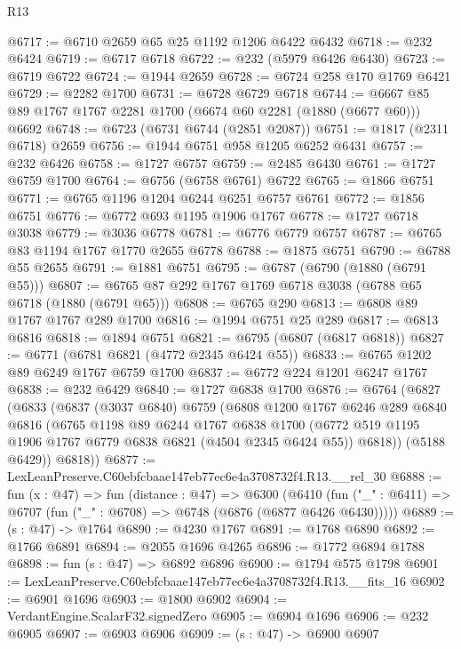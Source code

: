 \begin{lexlean}{R13}
\begin{coremodule}
@6717 := @6710 @2659 @65 @25 @1192 @1206 @6422 @6432
@6718 := @232 @6424
@6719 := @6717 @6718
@6722 := @232 (@5979 @6426 @6430)
@6723 := @6719 @6722
@6724 := @1944 @2659
@6728 := @6724 @258 @170 @1769 @6421
@6729 := @2282 @1700
@6731 := @6728 @6729 @6718
@6744 := @6667 @85 @89 @1767 @1767 @2281 @1700 (@6674 @60 @2281 (@1880 (@6677 @60))) @6692
@6748 := @6723 (@6731 @6744 (@2851 @2087))
@6751 := @1817 (@2311 @6718) @2659
@6756 := @1944 @6751 @958 @1205 @6252 @6431
@6757 := @232 @6426
@6758 := @1727 @6757
@6759 := @2485 @6430
@6761 := @1727 @6759 @1700
@6764 := @6756 (@6758 @6761) @6722
@6765 := @1866 @6751
@6771 := @6765 @1196 @1204 @6244 @6251 @6757 @6761
@6772 := @1856 @6751
@6776 := @6772 @693 @1195 @1906 @1767
@6778 := @1727 @6718 @3038
@6779 := @3036 @6778
@6781 := @6776 @6779 @6757
@6787 := @6765 @83 @1194 @1767 @1770 @2655 @6778
@6788 := @1875 @6751
@6790 := @6788 @55 @2655
@6791 := @1881 @6751
@6795 := @6787 (@6790 (@1880 (@6791 @55)))
@6807 := @6765 @87 @292 @1767 @1769 @6718 @3038 (@6788 @65 @6718 (@1880 (@6791 @65)))
@6808 := @6765 @290
@6813 := @6808 @89 @1767 @1767 @289 @1700
@6816 := @1994 @6751 @25 @289
@6817 := @6813 @6816
@6818 := @1894 @6751
@6821 := @6795 (@6807 (@6817 @6818))
@6827 := @6771 (@6781 @6821 (@4772 @2345 @6424 @55))
@6833 := @6765 @1202 @89 @6249 @1767 @6759 @1700
@6837 := @6772 @224 @1201 @6247 @1767
@6838 := @232 @6429
@6840 := @1727 @6838 @1700
@6876 := @6764
    (@6827
      (@6833
        (@6837
          (@3037 @6840)
          @6759
          (@6808
            @1200
            @1767
            @6246
            @289
            @6840
            @6816
            (@6765
              @1198
              @89
              @6244
              @1767
              @6838
              @1700
              (@6772 @519 @1195 @1906 @1767 @6779 @6838 @6821 (@4504 @2345 @6424 @55))
              @6818))
          (@5188 @6429))
        @6818))
@6877 := LexLeanPreserve.C60ebfcbaae147eb77ec6e4a3708732f4.R13.__rel_30
@6888 := fun (x : @47) =>
  fun (distance : @47) =>
  @6300
    (@6410 (fun ("_" : @6411) => @6707 (fun ("_" : @6708) => @6748 (@6876 (@6877 @6426 @6430)))))
@6889 := (s : @47) -> @1764
@6890 := @4230 @1767
@6891 := @1768 @6890
@6892 := @1766 @6891
@6894 := @2055 @1696 @4265
@6896 := @1772 @6894 @1788
@6898 := fun (s : @47) => @6892 @6896
@6900 := @1794 @575 @1798
@6901 := LexLeanPreserve.C60ebfcbaae147eb77ec6e4a3708732f4.R13.__fits_16
@6902 := @6901 @1696
@6903 := @1800 @6902
@6904 := VerdantEngine.ScalarF32.signedZero
@6905 := @6904 @1696
@6906 := @232 @6905
@6907 := @6903 @6906
@6909 := (s : @47) -> @6900 @6907

\end{coremodule}
\end{lexlean}
